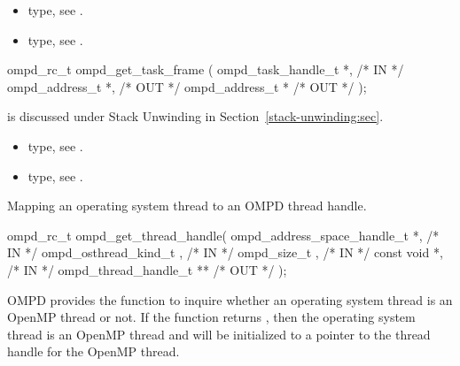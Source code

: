 \crossreferences
\begin{itemize}
	\item {} type, see .
	\item {} type, see .
\end{itemize}



%
\summary

\format
\cspecificstart
\begin{boxedcode}
ompd\_rc\_t ompd\_get\_task\_frame (
  ompd\_task\_handle\_t        *,                           /* IN */
  ompd\_address\_t            *,                    /* OUT */
  ompd\_address\_t            *                  /* OUT */
);
\end{boxedcode}
\cspecificend

\descr
{} is discussed under Stack Unwinding in
Section~\ref{stack-unwinding:sec}.

\argdesc

\crossreferences
\begin{itemize}
	\item {} type, see .
	\item {} type, see .
\end{itemize}

\summary
Mapping an operating system thread to an OMPD thread handle.
\format
\cspecificstart
\begin{boxedcode}
ompd\_rc\_t ompd\_get\_thread\_handle(
  ompd\_address\_space\_handle\_t   *,                            /* IN */
  ompd\_osthread\_kind\_t           ,                              /* IN */
  ompd\_size\_t                    ,                   /* IN */
  const void                    *,                          /* IN */
  ompd\_thread\_handle\_t         **                     /* OUT */
);
\end{boxedcode}
\cspecificend

\descr
OMPD provides the function 
to inquire whether an operating system thread is an OpenMP
thread or not.
If the function returns , then the operating
system thread is an OpenMP thread and 
will be initialized to a pointer to the thread handle for
the OpenMP thread.

